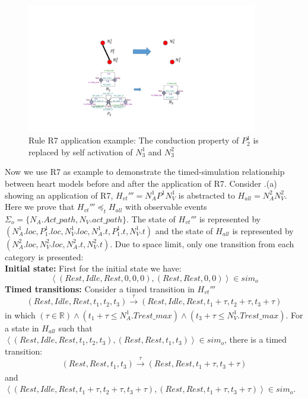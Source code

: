 \begin{figure}[!t]
	\centering
	\includegraphics[width=0.9\textwidth]{figs/rule7.pdf}
	\caption{\small Rule R7 application example: The conduction property of $P_2^1$ is replaced by self activation of $N_3^1$ and $N_3^2$}
	\label{fig:rule5}
\end{figure}
Now we use R7 as example to demonstrate the timed-simulation relationship between heart models before and after the application of R7.
Consider .(a) showing an application of R7, $H_{vt}'''=N^1_AP^1N^1_V$ is abstracted to $H_{all}=N^2_AN^2_V$. Here we prove that $H_{vt}'''\preceq_t H_{all}$ with observable events $\Sigma_o=\{N_A.Act\_path,N_V.act\_path\}$. The state of $H_{vt}'''$ is represented by $(N^1_A.loc,P^1_1.loc,N^1_V.loc,N^1_A.t,P^1_1.t,N^1_V.t)$ and the state of $H_{all}$ is represented by $(N^2_A.loc,N^2_V.loc,N^2_A.t,N^2_V.t)$. Due to space limit, only one transition from each category is presented:\\
\textbf{Initial state: }First for the initial state we have:
$$\left\langle (Rest,Idle,Rest,0,0,0),(Rest,Rest,0,0)\right\rangle\in sim_o$$ 
\textbf{Timed transitions: }Consider a timed transition in $H_{vt}'''$
$$(Rest,Idle,Rest,t_1,t_2,t_3)\xrightarrow[]{\tau}(Rest,Idle,Rest,t_1+\tau,t_2+\tau,t_3+\tau)$$
in which $(\tau\in\mathbb{R})\wedge (t_1+\tau\leq N^1_A.Trest\_max)\wedge( t_3+\tau\leq N^1_V.Trest\_max)$. For a state in $H_{all}$ such that $\left\langle (Rest,Idle,Rest,t_1,t_2,t_3),(Rest,Rest,t_1,t_3)\right\rangle\in sim_o$,  there is a timed transition:
$$(Rest,Rest,t_1,t_3)\xrightarrow[]{\tau}(Rest,Rest,t_1+\tau,t_3+\tau)$$
and $\left\langle (Rest,Idle,Rest,t_1+\tau,t_2+\tau,t_3+\tau),(Rest,Rest,t_1+\tau,t_3+\tau)\right\rangle\in sim_o$.\\
